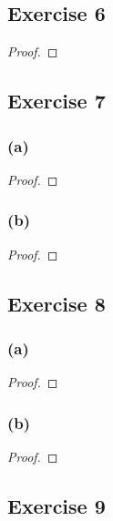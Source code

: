 \documentclass[14pt]{extarticle}
\begin{document}
\subsection{Exercise 6}

\begin{proof}

\end{proof}

\subsection{Exercise 7}

\subsubsection{(a)}

\begin{proof}

\end{proof}

\subsubsection{(b)}

\begin{proof}

\end{proof}

\subsection{Exercise 8}

\subsubsection{(a)}

\begin{proof}

\end{proof}

\subsubsection{(b)}

\begin{proof}

\end{proof}

\subsection{Exercise 9}
\end{document}
